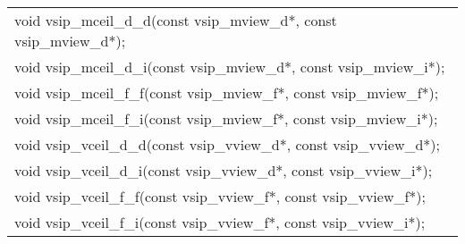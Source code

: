 \\\cvsiplh
\afh
\\\hspace*{.04\textwidth} {
\ttfamily
\begin{tabular}[H]{l}
void vsip\_mceil\_d\_d(const vsip\_mview\_d*, const vsip\_mview\_d*);\\
void vsip\_mceil\_d\_i(const vsip\_mview\_d*, const vsip\_mview\_i*);\\
void vsip\_mceil\_f\_f(const vsip\_mview\_f*, const vsip\_mview\_f*);\\
void vsip\_mceil\_f\_i(const vsip\_mview\_f*, const vsip\_mview\_i*);\\
void vsip\_vceil\_d\_d(const vsip\_vview\_d*, const vsip\_vview\_d*);\\
void vsip\_vceil\_d\_i(const vsip\_vview\_d*, const vsip\_vview\_i*);\\
void vsip\_vceil\_f\_f(const vsip\_vview\_f*, const vsip\_vview\_f*);\\
void vsip\_vceil\_f\_i(const vsip\_vview\_f*, const vsip\_vview\_i*);\\
\end{tabular}
}
\\\pyjvsiph
{}